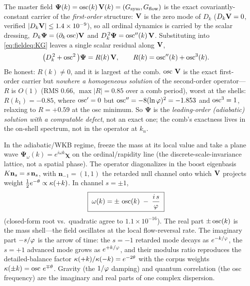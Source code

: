 The master field $\boldsymbol\Psi(k)=\operatorname{osc}(k)\,\mathbf{V}(k)=(G_{\mathrm{sym}},G_{\mathrm{flow}})$ is the exact covariantly-constant carrier of the \emph{first-order} structure: $\mathbf{V}$ is the zero mode of $D_k$ ($D_k\mathbf{V}=0$, verified $|D_k\mathbf{V}|\le1.4\times10^{-9}$), so all ordinal dynamics is carried by the scalar dressing, $D_k\boldsymbol\Psi=(\partial_k\operatorname{osc})\mathbf{V}$ and $D_k^{\,2}\boldsymbol\Psi=\operatorname{osc}''(k)\,\mathbf{V}$. Substituting into \eqref{eq:fieldeq:KG} leaves a single scalar residual along $\mathbf{V}$,
\begin{equation}
\big(D_k^{\,2}+\operatorname{osc}^2\big)\boldsymbol\Psi=R(k)\,\mathbf{V},\qquad R(k)=\operatorname{osc}''(k)+\operatorname{osc}^3(k).
\label{eq:fieldeq:residual}
\end{equation}
Be honest: $R(k)\neq0$, and it is largest \emph{at} the comb. $\operatorname{osc}\,\mathbf{V}$ is the exact first-order carrier but \emph{nowhere a homogeneous solution} of the second-order operator---$R$ is $O(1)$ (RMS $0.66$, $\max|R|=0.85$ over a comb period), worst at the shells: $R(k_1)=-0.85$, where $\operatorname{osc}'=0$ but $\operatorname{osc}''=-8(\ln\varphi)^2=-1.853$ and $\operatorname{osc}^3=1$, relaxing to $R=+0.59$ at the osc minimum. So $\boldsymbol\Psi$ is the \emph{leading-order (adiabatic) solution with a computable defect}, not an exact one; the comb's exactness lives in the on-shell spectrum, not in the operator at $k_n$.

In the adiabatic/WKB regime, freeze the mass at its local value and take a plane wave $\boldsymbol\Psi_\omega(k)=e^{i\omega k}\boldsymbol\chi$ on the ordinal/rapidity line (the discrete-scale-invariance lattice, not a spatial phase). The operator diagonalizes in the boost eigenbasis $K\mathbf n_s=s\,\mathbf n_s$, with $\mathbf n_{-1}=(1,1)$ the retarded null channel onto which $\mathbf{V}$ projects weight $\tfrac12 e^{-\theta}\propto\kappa(+k)$. In channel $s=\pm1$,
\begin{equation}
\boxed{\;\omega(k)=\pm\,\operatorname{osc}(k)\;-\;\frac{i\,s}{\varphi}\;}
\label{eq:fieldeq:dispersion}
\end{equation}
(closed-form root vs.\ quadratic agree to $1.1\times10^{-16}$). The real part $\pm\operatorname{osc}(k)$ is the mass shell---the field oscillates at the local flow-reversal rate. The imaginary part $-s/\varphi$ is the arrow of time: the $s=-1$ retarded mode decays as $e^{-k/\varphi}$, the $s=+1$ advanced mode grows as $e^{+k/\varphi}$, and their modulus ratio reproduces the detailed-balance factor $\kappa(+k)/\kappa(-k)=e^{-2\theta}$ with the corpus weights $\kappa(\pm k)=\operatorname{osc}\,e^{\mp\theta}$. Gravity (the $1/\varphi$ damping) and quantum correlation (the osc frequency) are the imaginary and real parts of one complex dispersion.

